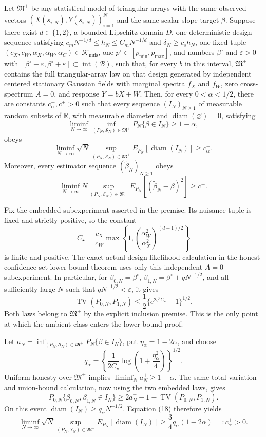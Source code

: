 Let \(\mathfrak M^+\) be any statistical model of triangular arrays with the same observed vectors \((X(s_{i,N}),Y(s_{i,N}))_{i=1}^N\) and the same scalar slope target \(\beta\).  Suppose there exist \(d\in\{1,2\}\), a bounded Lipschitz domain \(D\), one deterministic design sequence satisfying \(c_mN^{-1/d}\leq h_N\leq C_mN^{-1/d}\) and \(\delta_N\geq c_sh_N\), one fixed tuple \((c_X,c_W,\alpha_X,\alpha_W,\alpha_C)\in\mathcal K_{\mathrm{nuis}}\), one \(p^\circ\in[p_{\min},p_{\max}]\), and numbers \(\beta^\circ\) and \(\varepsilon>0\) with \([\beta^\circ-\varepsilon,\beta^\circ+\varepsilon]\subset\operatorname{int}(\mathcal B)\), such that, for every \(b\) in this interval, \(\mathfrak M^+\) contains the full triangular-array law on that design generated by independent centered stationary Gaussian fields with marginal spectra \(f_X\) and \(f_W\), zero cross-spectrum \(A=0\), and response \(Y=bX+W\).  Then, for every \(0<\alpha<1/2\), there are constants \(c^+_\alpha,c^+>0\) such that every sequence \((I_N)_{N\geq1}\) of measurable random subsets of \(\mathbb R\), with measurable diameter and \(\operatorname{diam}(\varnothing)=0\), satisfying
\[
 \liminf_{N\to\infty}\inf_{(P_N,\mathcal S_N)\in\mathfrak M^+}
 P_N\{\beta\in I_N\}\geq1-\alpha,
\]
obeys
\[
 \liminf_{N\to\infty}\sqrt N
 \sup_{(P_N,\mathcal S_N)\in\mathfrak M^+}
 E_{P_N}[\operatorname{diam}(I_N)]\geq c^+_\alpha.
\]
Moreover, every estimator sequence \((\widetilde\beta_N)_{N\geq1}\) obeys
\[
 \liminf_{N\to\infty}N
 \sup_{(P_N,\mathcal S_N)\in\mathfrak M^+}
 E_{P_N}[(\widetilde\beta_N-\beta)^2]\geq c^+.
\]

Fix the embedded subexperiment asserted in the premise.  Its nuisance tuple is fixed and strictly positive, so the constant
\[
 C_\star=\frac{c_X}{c_W}
 \max\left\{1,\left(\frac{\alpha_W^2}{\alpha_X^2}\right)^{(d+1)/2}\right\}
\]
is finite and positive.  The exact actual-design likelihood calculation in the honest-confidence-set lower-bound theorem uses only this independent \(A=0\) subexperiment.  In particular, for \(\beta_{0,N}=\beta^\circ\), \(\beta_{1,N}=\beta^\circ+qN^{-1/2}\), and all sufficiently large \(N\) such that \(qN^{-1/2}<\varepsilon\), it gives
\[
 \operatorname{TV}(P_{0,N},P_{1,N})
 \leq\frac12\{e^{2q^2C_\star}-1\}^{1/2}.
 \tag{18}
\]
Both laws belong to \(\mathfrak M^+\) by the explicit inclusion premise.  This is the only point at which the ambient class enters the lower-bound proof.

Let \(a_N^+=\inf_{(P_N,\mathcal S_N)\in\mathfrak M^+}P_N\{\beta\in I_N\}\), put \(\eta_\alpha=1-2\alpha\), and choose
\[
 q_\alpha=\left\{\frac{1}{2C_\star}
 \log\left(1+\frac{\eta_\alpha^2}{4}\right)\right\}^{1/2}.
\]
Uniform honesty over \(\mathfrak M^+\) implies \(\liminf_Na_N^+\geq1-\alpha\).  The same total-variation and union-bound calculation, now using the two embedded laws, gives
\[
 P_{0,N}\{\beta_{0,N},\beta_{1,N}\in I_N\}
 \geq2a_N^+-1-\operatorname{TV}(P_{0,N},P_{1,N}).
\]
On this event \(\operatorname{diam}(I_N)\geq q_\alpha N^{-1/2}\).  Equation (18) therefore yields
\[
 \liminf_{N\to\infty}\sqrt N
 \sup_{(P_N,\mathcal S_N)\in\mathfrak M^+}
 E_{P_N}[\operatorname{diam}(I_N)]
 \geq\frac34q_\alpha(1-2\alpha)=:c_\alpha^+>0.
\]

